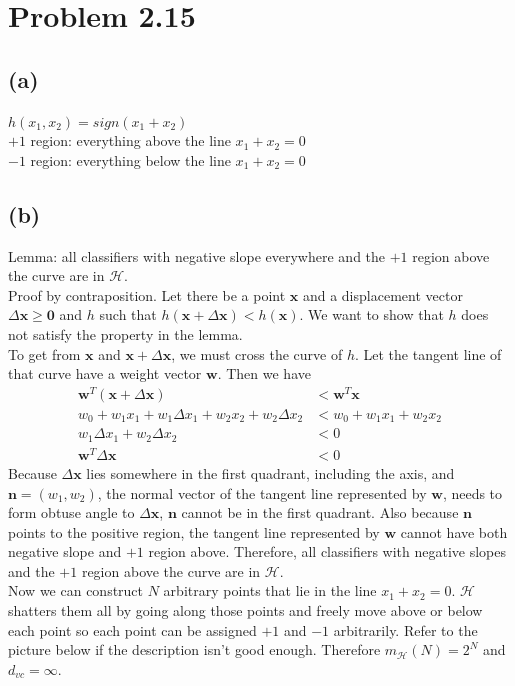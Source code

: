 \documentclass{article}
\begin{document}
	\section*{Problem 2.15}
	\subsection*{(a)}
		$h(x_1, x_2) = sign(x_1 + x_2)$\\
		$+1$ region: everything above the line $x_1 + x_2 = 0$\\
		$-1$ region: everything below the line $x_1 + x_2 = 0$
		
	\subsection*{(b)}
		Lemma: all classifiers with negative slope everywhere and the $+1$ region above the curve are in $\mathcal H$.\\
		Proof by contraposition. Let there be a point $\mathbf x$ and a displacement vector $\Delta \mathbf x \geq \mathbf 0$ and $h$ such that $h(\mathbf x + \Delta \mathbf x) < h(\mathbf x)$. We want to show that $h$ does not satisfy the property in the lemma.\\
		To get from $\mathbf x$ and $\mathbf x + \Delta \mathbf x$, we must cross the curve of $h$. Let the tangent line of that curve have a weight vector $\mathbf w$. Then we have
		\begin{align*}
			\mathbf w^T(\mathbf x + \Delta \mathbf x) &< \mathbf w^T \mathbf x\\
			w_0 + w_1x_1 + w_1\Delta x_1 + w_2x_2 + w_2\Delta x_2 &< w_0 + w_1x_1 + w_2x_2\\
			w_1\Delta x_1 + w_2\Delta x_2 &< 0\\
			\mathbf w^T\Delta \mathbf x &< 0
		\end{align*}
		Because $\Delta \mathbf x$ lies somewhere in the first quadrant, including the axis, and $\mathbf n = (w_1, w_2)$, the normal vector of the tangent line represented by $\mathbf w$, needs to form obtuse angle to $\Delta \mathbf x$, $\mathbf n$ cannot be in the first quadrant. Also because $\mathbf n$ points to the positive region, the tangent line represented by $\mathbf w$ cannot have both negative slope and $+1$ region above. Therefore, all classifiers with negative slopes and the $+1$ region above the curve are in $\mathcal H$.\\
		Now we can construct $N$ arbitrary points that lie in the line $x_1 + x_2 = 0$. $\mathcal H$ shatters them all by going along those points and freely move above or below each point so each point can be assigned $+1$ and $-1$ arbitrarily. Refer to the picture below if the description isn't good enough. Therefore $m_\mathcal H(N) = 2^N$ and $d_{vc} = \infty$.\\
\end{document}
